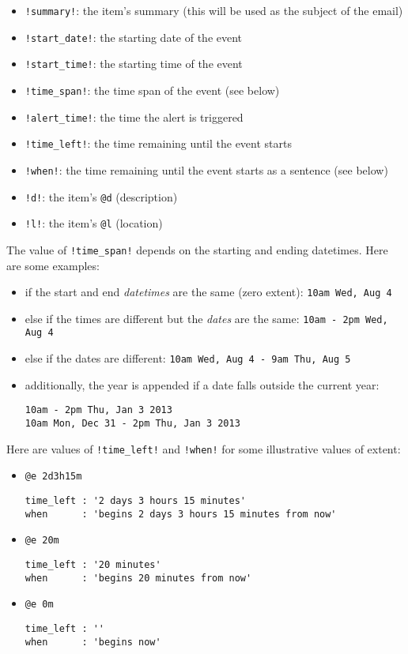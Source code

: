 \documentclass[]{article}
\begin{document}
\begin{itemize}
\item
  \texttt{!summary!}: the item's summary (this will be used as the
  subject of the email)
\item
  \texttt{!start\_date!}: the starting date of the event
\item
  \texttt{!start\_time!}: the starting time of the event
\item
  \texttt{!time\_span!}: the time span of the event (see below)
\item
  \texttt{!alert\_time!}: the time the alert is triggered
\item
  \texttt{!time\_left!}: the time remaining until the event starts
\item
  \texttt{!when!}: the time remaining until the event starts as a
  sentence (see below)
\item
  \texttt{!d!}: the item's \texttt{@d} (description)
\item
  \texttt{!l!}: the item's \texttt{@l} (location)
\end{itemize}

The value of \texttt{!time\_span!} depends on the starting and ending
datetimes. Here are some examples:

\begin{itemize}
\item
  if the start and end \emph{datetimes} are the same (zero extent):
  \texttt{10am Wed, Aug 4}
\item
  else if the times are different but the \emph{dates} are the same:
  \texttt{10am - 2pm Wed, Aug 4}
\item
  else if the dates are different:
  \texttt{10am Wed, Aug 4 - 9am Thu, Aug 5}
\item
  additionally, the year is appended if a date falls outside the current
  year:

\begin{verbatim}
10am - 2pm Thu, Jan 3 2013
10am Mon, Dec 31 - 2pm Thu, Jan 3 2013
\end{verbatim}
\end{itemize}

Here are values of \texttt{!time\_left!} and \texttt{!when!} for some
illustrative values of extent:

\begin{itemize}
\item
  \texttt{@e 2d3h15m}

\begin{verbatim}
time_left : '2 days 3 hours 15 minutes'
when      : 'begins 2 days 3 hours 15 minutes from now'
\end{verbatim}
\item
  \texttt{@e 20m}

\begin{verbatim}
time_left : '20 minutes'
when      : 'begins 20 minutes from now'
\end{verbatim}
\item
  \texttt{@e 0m}

\begin{verbatim}
time_left : ''
when      : 'begins now'
\end{verbatim}
\end{itemize}
\end{document}
